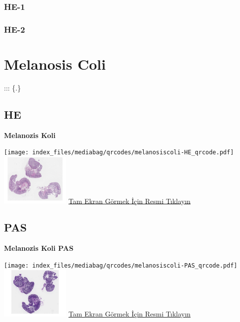 \documentclass[
  letterpaper,
  DIV=11,
  numbers=noendperiod]{scrreprt}
\begin{document}
\subsubsection{HE-1}\label{he-1-1}

\subsubsection{HE-2}\label{he-2-1}

\section{Melanosis Coli}\label{sec-melanosis-coli}

::: \{.\}

\subsection{HE}\label{he-3}

\textbf{Melanozis Koli}

\texttt{[image: index\_files/mediabag/qrcodes/melanosiscoli-HE\_qrcode.pdf]}
\href{https://images.patolojiatlasi.com/melanosiscoli/HE.html}{\includegraphics[width=0.25\textwidth,height=\textheight]{./screenshots/thumbnail_melanosiscoli-HE.png}}
\href{https://images.patolojiatlasi.com/melanosiscoli/HE.html}{Tam Ekran
Görmek İçin Resmi Tıklayın}

\subsection{PAS}\label{pas-1}

\textbf{Melanozis Koli PAS}

\texttt{[image: index\_files/mediabag/qrcodes/melanosiscoli-PAS\_qrcode.pdf]}
\href{https://images.patolojiatlasi.com/melanosiscoli/PAS.html}{\includegraphics[width=0.25\textwidth,height=\textheight]{./screenshots/thumbnail_melanosiscoli-PAS.png}}
\href{https://images.patolojiatlasi.com/melanosiscoli/PAS.html}{Tam
Ekran Görmek İçin Resmi Tıklayın}
\end{document}
